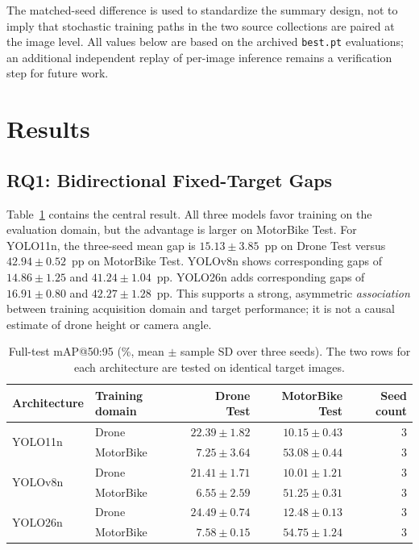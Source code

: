 \documentclass[conference,a4paper]{IEEEtran}
\begin{document}
The matched-seed difference is used to standardize the summary design, not to imply that stochastic training paths in the two source collections are paired at the image level. All values below are based on the archived \texttt{best.pt} evaluations; an additional independent replay of per-image inference remains a verification step for future work.

\section{Results}
\subsection{RQ1: Bidirectional Fixed-Target Gaps}
Table~\ref{tab:matrix} contains the central result. All three models favor training on the evaluation domain, but the advantage is larger on MotorBike Test. For YOLO11n, the three-seed mean gap is $15.13\pm3.85$~pp on Drone Test versus $42.94\pm0.52$~pp on MotorBike Test. YOLOv8n shows corresponding gaps of $14.86\pm1.25$ and $41.24\pm1.04$~pp. YOLO26n adds corresponding gaps of $16.91\pm0.80$ and $42.27\pm1.28$~pp. This supports a strong, asymmetric \emph{association} between training acquisition domain and target performance; it is not a causal estimate of drone height or camera angle.

\begin{table}[t]
\centering
\caption{Full-test mAP@50:95 (\%, mean $\pm$ sample SD over three seeds). The two rows for each architecture are tested on identical target images.}\label{tab:matrix}
\begin{tabular}{llrrr}\toprule
Architecture & Training domain & Drone Test & MotorBike Test & Seed count\\\midrule
\multirow{2}{*}{YOLO11n} & Drone & $22.39\pm1.82$ & $10.15\pm0.43$ & 3 \\
 & MotorBike & $7.25\pm3.64$ & $53.08\pm0.44$ & 3 \\
\multirow{2}{*}{YOLOv8n} & Drone & $21.41\pm1.71$ & $10.01\pm1.21$ & 3 \\
 & MotorBike & $6.55\pm2.59$ & $51.25\pm0.31$ & 3 \\
\multirow{2}{*}{YOLO26n} & Drone & $24.49\pm0.74$ & $12.48\pm0.13$ & 3 \\
 & MotorBike & $7.58\pm0.15$ & $54.75\pm1.24$ & 3 \\
\bottomrule
\end{tabular}
\end{table}
\end{document}
